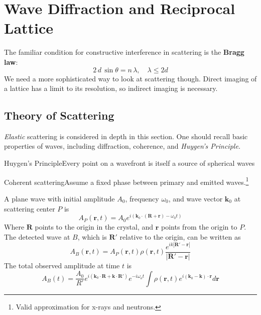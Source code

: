 \chapter{Wave Diffraction and Reciprocal Lattice}
The familiar condition for constructive interference in scattering is the \textbf{Bragg law}:
\begin{equation}
    2\, d\, \sin{\theta} = n\, \lambda, \quad \lambda \leq 2d
\end{equation}
We need a more sophisticated way to look at scattering though. Direct imaging of a lattice has a limit to its resolution, so indirect imaging is necessary.



\section{Theory of Scattering}
\emph{Elastic} scattering is considered in depth in this section. One should recall basic properties of waves, including diffraction, coherence, and \emph{Huygen's Principle.}
\begin{definition}
{Huygen's Principle}{Every point on a wavefront is itself a source of spherical waves}
\end{definition}
\begin{definition}
{Coherent scattering}{Assume a fixed phase between primary and emitted waves.\footnote{Valid approximation for x-rays and neutrons.}}
\end{definition}

A plane wave with initial amplitude $A_0$, frequency $\omega_0$, and wave vector $\mathbf{k}_0$ at scattering center $P$ is
\begin{equation*}
    A_P(\mathbf{r}, t) = A_0 e^{i(\mathbf{k}_0\cdot(\mathbf{R}+\mathbf{r})-\omega_0 t)}
\end{equation*}
Where $\mathbf{R}$ points to the origin in the crystal, and $\mathbf{r}$ points from the origin to $P$. The detected wave at $B$, which is $\mathbf{R}'$ relative to the origin, can be written as
\begin{equation*}
    A_B(\mathbf{r}, t) = A_P(\mathbf{r}, t) \rho(\mathbf{r}, t) \frac{e^{ik|\mathbf{R}'-\mathbf{r}|}}{|\mathbf{R}'-\mathbf{r}|}
\end{equation*}
The total observed amplitude at time $t$ is 
\begin{equation*}
    A_B(t) = \frac{A_0}{R'} e^{i(\mathbf{k}_0\cdot\mathbf{R}+\mathbf{k}\cdot\mathbf{R}')}e^{-i\omega_o t}\int \rho(\mathbf{r}, t)e^{i(\mathbf{k}_0-\mathbf{k})\cdot \mathbf{r}} d\mathbf{r}
\end{equation*}

